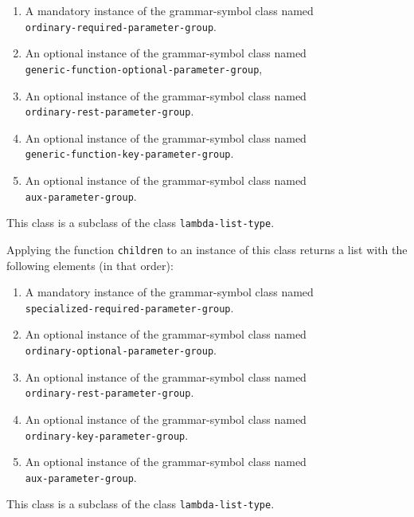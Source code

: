 \begin{enumerate}
\item A mandatory instance of the grammar-symbol class named\\
  \texttt{ordinary-required-parameter-group}.
\item An optional instance of the grammar-symbol class named\\
\texttt{generic-function-optional-parameter-group},
\item An optional instance of the grammar-symbol class named\\
\texttt{ordinary-rest-parameter-group}.
\item An optional instance of the grammar-symbol class named\\
\texttt{generic-function-key-parameter-group}.
\item An optional instance of the grammar-symbol class named\\
\texttt{aux-parameter-group}.
\end{enumerate}

This class is a subclass of the class \texttt{lambda-list-type}.


Applying the function \texttt{children} to an instance of this class
returns a list with the following elements (in that order):

\begin{enumerate}
\item A mandatory instance of the grammar-symbol class named\\
  \texttt{specialized-required-parameter-group}.
\item An optional instance of the grammar-symbol class named\\
  \texttt{ordinary-optional-parameter-group}.
\item An optional instance of the grammar-symbol class named\\
\texttt{ordinary-rest-parameter-group}.
\item An optional instance of the grammar-symbol class named\\
\texttt{ordinary-key-parameter-group}.
\item An optional instance of the grammar-symbol class named\\
\texttt{aux-parameter-group}.
\end{enumerate}

This class is a subclass of the class \texttt{lambda-list-type}.

